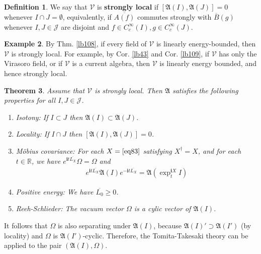 \documentclass[12pt,b5paper,notitlepage]{article}
\theoremstyle{definition}
\newtheorem{df}{Definition}[section]
\newtheorem{eg}[df]{Example}
\theoremstyle{plain}
\newtheorem{thm}[df]{Theorem}
\newcommand{\fk}{\mathfrak}
\newcommand{\mc}{\mathcal}
\newcommand{\ovl}{\overline}
\newcommand{\im}{\mathbf{i}}
\newcommand{\Rbb}{\mathbb R}
\newcommand{\MV}{\mathcal V}
\numberwithin{equation}{section}
\begin{document}
\subsection{}




\begin{df}
We say that $\mc V$ is \textbf{strongly local}  if $[\fk A(I),\fk A(J)]=0$ whenever $I\cap J=\emptyset$, equivalently, if $\ovl{A(f)}$ commutes strongly with $\ovl B(g)$ whenever $I,J\in\mc J$ are disjoint and $f\in C_c^\infty(I),g\in C_c^\infty(J)$.
\end{df}


\begin{eg}
By Thm. \ref{lb108}, if every field of $\mc V$ is linearly energy-bounded, then $\MV$ is strongly local. For example, by Cor. \ref{lb43} and Cor. \ref{lb109}, if $\MV$ has only the Virasoro field, or if $\MV$ is a current algebra, then $\MV$ is linearly energy bounded, and hence strongly local.
\end{eg}



\begin{thm}\label{lb99}
Assume that $\MV$ is strongly local. Then $\fk A$ satisfies the following properties for all $I,J\in\mc J$.
\begin{enumerate}[label=(\alph*)]
\item Isotony: If $I\subset J$ then $\fk A(I)\subset\fk A(J)$.
\item Locality: If $I\cap J$ then $[\fk A(I),\fk A(J)]=0$.
\item M\"obius covariance: For each $X=\eqref{eq83}$ satisfying $X^\dagger=X$, and for each $t\in\Rbb$, we have $e^{\im t\ovl{L_X}}\Omega=\Omega$ and
\begin{align*}
e^{\im t\ovl{L_X}}\fk A(I)e^{-\im t\ovl{L_X}}=\fk A(\exp^{\im X}_t I)
\end{align*}
\item Positive energy: We have $\ovl{L_0}\geq0$.
\item Reeh-Schlieder: The vacuum vector $\Omega$ is a cylic vector of $\fk A(I)$.
\end{enumerate}
\end{thm}

It follows that $\Omega$ is also separating under $\fk A(I)$, because $\fk A(I)'\supset \fk A(I')$ (by locality) and $\Omega$ is $\fk A(I')$-cyclic. Therefore, the Tomita-Takesaki theory can be applied to the pair $(\fk A(I),\Omega)$.
\end{document}
